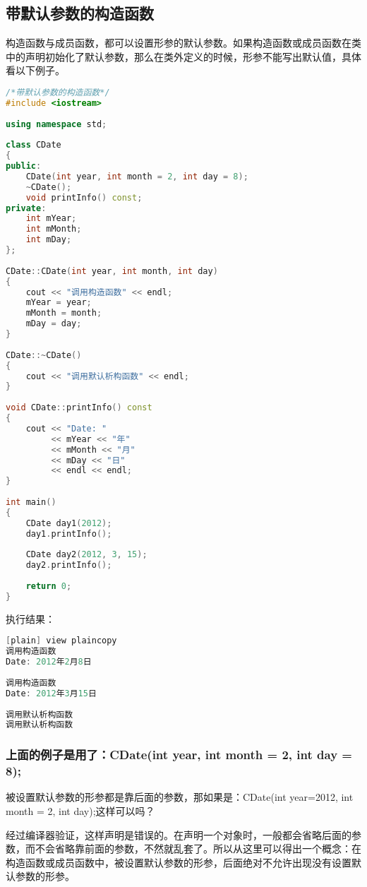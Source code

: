 \documentclass{article}
\begin{document}
\subsection{带默认参数的构造函数}
\label{sec-4-2}
构造函数与成员函数，都可以设置形参的默认参数。如果构造函数或成员函数在类中的声明初始化了默认参数，那么在类外定义的时候，形参不能写出默认值，具体看以下例子。
\begin{lstlisting}[language=c++]
/*带默认参数的构造函数*/  
#include <iostream>  
  
using namespace std;  
  
class CDate  
{  
public:  
    CDate(int year, int month = 2, int day = 8);  
    ~CDate();  
    void printInfo() const;  
private:  
    int mYear;  
    int mMonth;  
    int mDay;  
};  
  
CDate::CDate(int year, int month, int day)  
{  
    cout << "调用构造函数" << endl;  
    mYear = year;  
    mMonth = month;  
    mDay = day;  
}  
  
CDate::~CDate()  
{  
    cout << "调用默认析构函数" << endl;  
}  
  
void CDate::printInfo() const  
{  
    cout << "Date: "  
         << mYear << "年"  
         << mMonth << "月"  
         << mDay << "日"  
         << endl << endl;  
}  
  
int main()  
{  
    CDate day1(2012);  
    day1.printInfo();  
  
    CDate day2(2012, 3, 15);  
    day2.printInfo();  
  
    return 0;  
}  
\end{lstlisting}

执行结果：
\begin{lstlisting}[language=c++]
[plain] view plaincopy
调用构造函数  
Date: 2012年2月8日  
  
调用构造函数  
Date: 2012年3月15日  
  
调用默认析构函数  
调用默认析构函数  
\end{lstlisting}

\subsubsection{上面的例子是用了：CDate(int year, int month = 2, int day = 8);}
\label{sec-4-2-1}

被设置默认参数的形参都是靠后面的参数，那如果是：CDate(int year=2012, int month = 2, int day);这样可以吗？

经过编译器验证，这样声明是错误的。在声明一个对象时，一般都会省略后面的参数，而不会省略靠前面的参数，不然就乱套了。所以从这里可以得出一个概念：在构造函数或成员函数中，被设置默认参数的形参，后面绝对不允许出现没有设置默认参数的形参。
\end{document}
